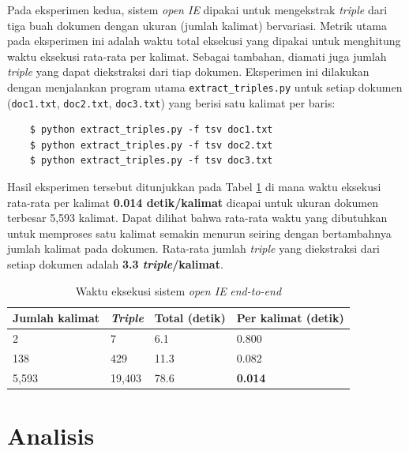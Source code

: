 Pada eksperimen kedua, sistem \textit{open IE} dipakai untuk mengekstrak \textit{triple} dari tiga buah dokumen dengan ukuran (jumlah kalimat) bervariasi. Metrik utama pada eksperimen ini adalah waktu total eksekusi yang dipakai untuk menghitung waktu eksekusi rata-rata per kalimat. Sebagai tambahan, diamati juga jumlah \textit{triple} yang dapat diekstraksi dari tiap dokumen. Eksperimen ini dilakukan dengan menjalankan program utama \verb|extract_triples.py| untuk setiap dokumen (\verb|doc1.txt|, \verb|doc2.txt|, \verb|doc3.txt|) yang berisi satu kalimat per baris:

\begin{verbatim}
	$ python extract_triples.py -f tsv doc1.txt
	$ python extract_triples.py -f tsv doc2.txt
	$ python extract_triples.py -f tsv doc3.txt
\end{verbatim}

Hasil eksperimen tersebut ditunjukkan pada Tabel \ref{tab:system_extraction_time} di mana waktu eksekusi rata-rata per kalimat \textbf{0.014 detik/kalimat} dicapai untuk ukuran dokumen terbesar 5,593 kalimat. Dapat dilihat bahwa rata-rata waktu yang dibutuhkan untuk memproses satu kalimat semakin menurun seiring dengan bertambahnya jumlah kalimat pada dokumen. Rata-rata jumlah \textit{triple} yang diekstraksi dari setiap dokumen adalah \textbf{3.3 \textit{triple}/kalimat}.

\begin{table}
	\caption{Waktu eksekusi sistem \textit{open IE} \textit{end-to-end}}
	\label{tab:system_extraction_time}
	\centering
	\begin{tabular}{p{4cm} p{2.5cm} p{2.5cm} p{2.5cm}}
		\hline
		\textbf{Jumlah kalimat} & \textbf{\textit{Triple}} & \textbf{Total (detik)} & \textbf{Per kalimat (detik)} \\
		\hline
		2 & 7 & 6.1 & 0.800 \\
		138 & 429 & 11.3 & 0.082 \\
		5,593 & 19,403 & 78.6 & \textbf{0.014} \\
		\hline
	\end{tabular}
\end{table}

\section{Analisis}

